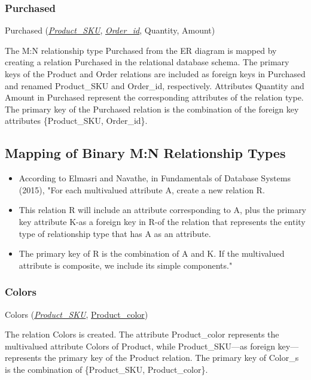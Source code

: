 \subsubsection{Purchased}

Purchased (\underline{\textit{Product\_SKU}}, \underline{\textit{Order\_id}}, Quantity, Amount)

The M:N relationship type Purchased from the ER diagram is mapped by creating a relation Purchased in the relational database schema. The primary keys of the Product and Order relations are included as foreign keys in Purchased and renamed Product\_SKU and Order\_id, respectively. Attributes Quantity and Amount in Purchased represent the corresponding attributes of the relation type. The primary key of the Purchased relation is the combination of the foreign key attributes \{Product\_SKU, Order\_id\}.

\subsection{Mapping of Binary M:N Relationship Types}

\begin{itemize}
  \item According to Elmasri and Navathe, in Fundamentals of Database Systems (2015), "For each multivalued attribute A, create a new relation R.
  \item This relation R will include an attribute corresponding to A, plus the primary key attribute K-as a foreign key in R-of the relation that represents the entity type of relationship type that has A as an attribute.
  \item The primary key of R is the combination of A and K. If the multivalued attribute is composite, we include its simple components." \cite{elmasri}
\end{itemize}

\subsubsection{Colors}

Colors (\underline{\textit{Product\_SKU}}, \underline{Product\_color})

The relation Colors is created. The attribute Product\_color represents the multivalued attribute Colors of Product, while Product\_SKU—as foreign key—represents the primary key of the Product relation. The primary key of Color\_s is the combination of \{Product\_SKU, Product\_color\}.

